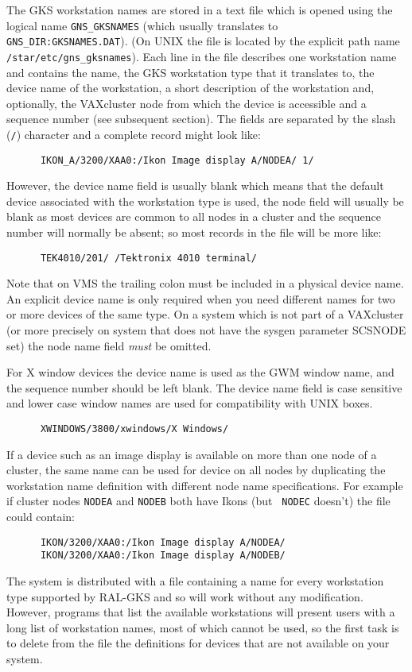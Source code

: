 The GKS workstation names are stored in a text file which is opened using the
logical name {\tt GNS\_GKSNAMES} (which usually translates to {\tt
GNS\_DIR:GKSNAMES.DAT}). (On UNIX the file is located by the explicit
path name {\tt /star/etc/gns\_gksnames}).
Each line in the file describes one workstation name
and contains the name, the GKS workstation type that it translates to, the
device name of the workstation, a short description of the workstation and,
optionally, the VAXcluster node from which the device is accessible and a
sequence number (see subsequent section). The
fields are separated by the slash ({\tt/}) character and a complete record
might look like:
\begin{verbatim}
      IKON_A/3200/XAA0:/Ikon Image display A/NODEA/ 1/
\end{verbatim}
However, the device name field is usually blank which means that the
default device associated with the workstation type is used, the node field
will usually be blank as most devices are common to all nodes in a cluster
and the sequence number will normally be absent;
so most records in the file will be more like:
\begin{verbatim}
      TEK4010/201/ /Tektronix 4010 terminal/
\end{verbatim}
Note that on VMS the trailing colon must be included in a physical device name.
An explicit device name is only required when you need different names for two
or more devices of the same type. On a system which is not part of a VAXcluster
(or more precisely on system that does not have the sysgen parameter SCSNODE
set) the node name field {\em must} be omitted.

For X window devices the device name is used as the GWM window name, and the
sequence number should be left blank. The device name field is case sensitive
and lower case window names are used for compatibility with UNIX boxes.
\begin{verbatim}
      XWINDOWS/3800/xwindows/X Windows/
\end{verbatim}

If a device such as an image display is available on more than one node of a
cluster, the same name can be used for device on all nodes by duplicating the 
workstation name definition with different node name specifications. For
example if cluster nodes {\tt NODEA} and {\tt NODEB} both have Ikons (but {\tt
NODEC} doesn't) the file could contain:
\begin{verbatim}
      IKON/3200/XAA0:/Ikon Image display A/NODEA/
      IKON/3200/XAA0:/Ikon Image display A/NODEB/
\end{verbatim}
The system is distributed with a file containing a name for every workstation
type supported by RAL-GKS and so will work without any modification. However,
programs that list the available workstations will
present users with a long list of workstation names, most of which
cannot be used, so the first task is to delete from the file the definitions
for devices that are not available on your system. 

